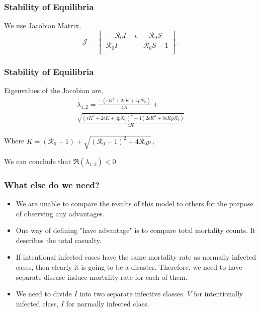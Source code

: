 \documentclass{beamer}
\newcommand{\R}{\mathcal{R}}
\begin{document}
\begin{frame}
\frametitle{Stability of Equilibria}

We use Jacobian Matrix,
\pause
\begin{equation}
\mathcal{J} =
\begin{bmatrix}
    \ -\R_0 I-\epsilon       & -\R_0 S \\
    \ \R_0 I       & \R_0 S-1 \\
\end{bmatrix} \,.
\end{equation}
\end{frame}
\begin{frame}
\frametitle{Stability of Equilibria}

Eigenvalues of the Jacobian are,
\begin{equation}
\begin{split}
\lambda_{1,2} = \frac{-(\epsilon K^2+2\epsilon K +4p\mathcal{R}_0)}{4K} \pm \\ \frac{\sqrt{(\epsilon K^2+2\epsilon K +4p\mathcal{R}_0)^2-4(2\epsilon K^3+8\epsilon Kp\mathcal{R}_0)}}{4K}
\end{split}
\end{equation}

Where $K = (\R_0 -1)+ \sqrt{(\R_0-1)^2+4\R_0 p}$\,,

We can conclude that $\Re(\lambda_{1,2})<0$
\end{frame}
\begin{frame}
\frametitle{What else do we need?}
\pause
\begin{itemize}
\item We are unable to compare the results of this model to others for the purpose of observing any advantages.
\pause
\item One way of defining "have advantage" is to compare total mortality counts. It describes the total casualty.
\pause
\item If intentional infected cases have the same mortality rate as normally infected cases, then clearly it is going to be a disaster. Therefore, we need to have separate disease induce mortality rate for each of them.
\pause
\item We need to divide $I$ into two separate infective classes. $V$ for intentionally infected class, $I$ for normally infected class.
\end{itemize}
\end{frame}
\end{document}
